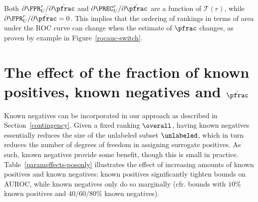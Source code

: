 Both $\partial \FPR_U^r / \partial \hat{\pfrac}$ and $\partial \PREC_U^r / \partial \hat{\pfrac}$ are a function of $\mathcal{T}(r)$, while $\partial \FPR_U^r / \partial \hat{\pfrac} = 0$. This implies that the ordering of rankings in terms of area under the ROC curve can change when the estimate of $\pfrac$ changes, as proven by example in Figure~\ref{rocauc-switch}.


\section{The effect of the fraction of known positives, known negatives and $\hat{\pfrac}$} \label{knownneg}
Known negatives can be incorporated in our approach as described in Section~\ref{contingency}. Given a fixed ranking $\overall$, having known negatives essentially reduces the size of the unlabeled subset $\unlabeled$, which in turn reduces the number of degrees of freedom in assigning surrogate positives. As such, known negatives provide some benefit, though this is small in practice. Table~\ref{parameffects-posonly} illustrates the effect of increasing amounts of known positives and known negatives: known positives significantly tighten bounds on AUROC, while known negatives only do so marginally (cfr. bounds with $10\%$ known positives and $40/60/80\%$ known negatives).

\def\realauc{0.765}

